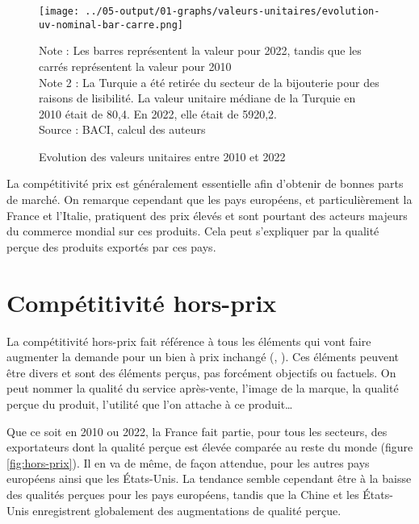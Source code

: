 \documentclass[french,10pt,a4paper]{article}
\begin{document}
\begin{figure}[!h]
  \centering
  \texttt{[image: ../05-output/01-graphs/valeurs-unitaires/evolution-uv-nominal-bar-carre.png]}
  \captionsetup{justification=justified, singlelinecheck=false, font=small}
  \caption*{Note : Les barres représentent la valeur pour 2022, tandis que les carrés représentent la valeur pour 2010 \\
  Note 2 : La Turquie a été retirée du secteur de la bijouterie pour des raisons de lisibilité. La valeur unitaire médiane de la Turquie en 2010 était de 80,4. En 2022, elle était de 5920,2. \\
  Source : BACI, calcul des auteurs}
  \captionsetup{justification=centering, singlelinecheck=true, font=normalsize}
  \caption{Evolution des valeurs unitaires entre 2010 et 2022}
  \label{fig:valeurs-unitaires}
\end{figure}

La compétitivité prix est généralement essentielle afin d'obtenir de bonnes parts de marché. On remarque cependant que les pays européens, et particulièrement la France et l'Italie, pratiquent des prix élevés et sont pourtant des acteurs majeurs du commerce mondial sur ces produits. Cela peut s'expliquer par la qualité perçue des produits exportés par ces pays.

\section{Compétitivité hors-prix}
La compétitivité hors-prix fait référence à tous les éléments qui vont faire augmenter la demande pour un bien à prix inchangé (\cite{Khandelwal2013}, \cite{Bas2015}). Ces éléments peuvent être divers et sont des éléments perçus, pas forcément objectifs ou factuels. On peut nommer la qualité du service après-vente, l'image de la marque, la qualité perçue du produit, l'utilité que l'on attache à ce produit…

Que ce soit en 2010 ou 2022, la France fait partie, pour tous les secteurs, des exportateurs dont la qualité perçue est élevée comparée au reste du monde (figure \ref{fig:hors-prix}). Il en va de même, de façon attendue, pour les autres pays européens ainsi que les États-Unis. La tendance semble cependant être à la baisse des qualités perçues pour les pays européens, tandis que la Chine et les États-Unis enregistrent globalement des augmentations de qualité perçue.
\end{document}
